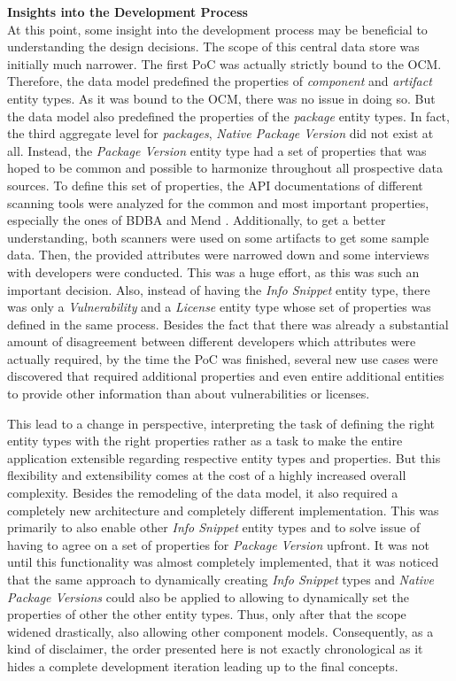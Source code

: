 \noindent\textbf{Insights into the Development Process}\\
At this point, some insight into the development process may be beneficial to understanding the design decisions. The scope of this central data store was initially much narrower. The first PoC was actually strictly bound to the OCM. Therefore, the data model predefined the properties of \emph{component} and \emph{artifact} entity types. As it was bound to the OCM, there was no issue in doing so. But the data model also predefined the properties of the \emph{package} entity types. In fact, the third aggregate level for \emph{packages}, \emph{Native Package Version} did not exist at all. Instead, the \emph{Package Version} entity type had a set of properties that was hoped to be common and possible to harmonize throughout all prospective data sources. To define this set of properties, the API documentations of different scanning tools were analyzed for the common and most important properties, especially the ones of BDBA and Mend \cite{MendAPI}. Additionally, to get a better understanding, both scanners were used on some artifacts to get some sample data. Then, the provided attributes were narrowed down and some interviews with developers were conducted. This was a huge effort, as this was such an important decision. Also, instead of having the \emph{Info Snippet} entity type, there was only a \emph{Vulnerability} and a \emph{License} entity type whose set of properties was defined in the same process. Besides the fact that there was already a substantial amount of disagreement between different developers which attributes were actually required, by the time the PoC was finished, several new use cases were discovered that required additional properties and even entire additional entities to provide other information than about vulnerabilities or licenses.\par
This lead to a change in perspective, interpreting the task of defining the right entity types with the right properties rather as a task to make the entire application extensible regarding respective entity types and properties. But this flexibility and extensibility comes at the cost of a highly increased overall complexity. Besides the remodeling of the data model, it also required a completely new architecture and completely different implementation. This was primarily to also enable other \emph{Info Snippet} entity types and to solve issue of having to agree on a set of properties for \emph{Package Version} upfront. It was not until this functionality was almost completely implemented, that it was noticed that the same approach to dynamically creating \emph{Info Snippet} types and \emph{Native Package Versions} could also be applied to allowing to dynamically set the properties of other the other entity types. Thus, only after that the scope widened drastically, also allowing other component models. Consequently, as a kind of disclaimer, the order presented here is not exactly chronological as it hides a complete development iteration leading up to the final concepts.\\\par

